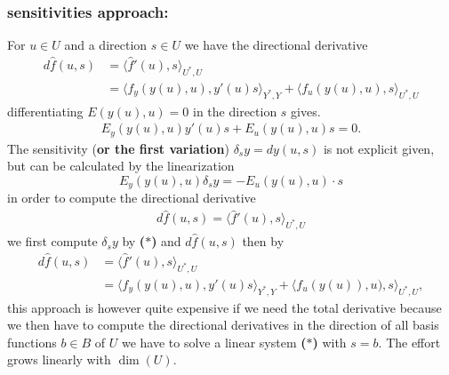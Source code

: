 \subsubsection{sensitivities approach:} For $u \in U$ and a direction $s \in U$ we have the directional derivative 
	\begin{align*}
		d\hat{f}(u, s) &= \langle \hat{f}'(u), s \rangle_{U^*, U} \\
		&= \langle f_y(y(u), u), y'(u)s \rangle_{Y^*, Y} 
		+ \langle f_u(y(u), u), s \rangle_{U^*,U}
	\end{align*}
	differentiating $E(y(u), u) = 0$ in the direction $s$ gives. 
	\begin{align*}
		E_y(y(u), u) y'(u)s + E_u(y(u), u)s = 0.
	\end{align*}
	The sensitivity (\textbf{or the first variation}) $\delta_s y = dy(u, s)$ is not explicit given, but can be calculated by the linearization
	\begin{equation}
	\tag{$*$}
		E_y(y(u), u)\delta_s y = -E_u(y(u), u) \cdot  s 
	\end{equation}
	in order to compute the directional derivative 
	\begin{align*}
		d\hat{f}(u, s) = \langle \hat{f}'(u), s \rangle_{U^*, U}
	\end{align*}
	we first compute $\delta_s y$ by \textbf{($*$)} and $d\hat{f}(u, s)$ then by 
	\begin{align*}
		d\hat{f}(u, s) &= \langle \hat{f}'(u), s \rangle_{U^*, U} \\
		&= \langle f_y(y(u), u), y'(u)s \rangle_{Y^*, Y} 
		+ \langle f_u(y(u)), u), s \rangle_{U^*,U},
	\end{align*}
	this approach is however quite expensive if we need the total derivative because we then have to compute the directional derivatives in the direction of all basis functions $b \in B$ of $U$ we have to solve a linear system \textbf{($*$)} with $s = b$. The effort grows linearly with $\dim(U)$. 
	
	
